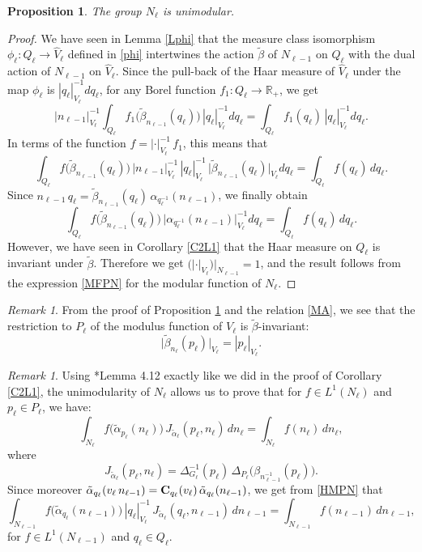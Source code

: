 \documentclass[a4paper,11pt,reqno]{amsart}
\numberwithin{equation}{section}
\newtheorem{proposition}[theorem]{Proposition}
\theoremstyle{remark}
\newtheorem{remark}[theorem]{Remark}
\theoremstyle{definition}
\newcommand{\R}{{\mathbb R}}
\begin{document}
 \begin{proposition}
\label{NUM}
The group $N_\ell$ is unimodular.
\end{proposition}
\begin{proof}
We have seen in Lemma \ref{Lphi} that the  measure class  isomorphism $\phi_\ell:Q_\ell\to \hat V_\ell$ defined in \eqref{phi}
intertwines the action $\tilde\beta$ of $N_{\ell-1}$ on $Q_\ell$ with
the dual action of $N_{\ell-1}$ on $\hat V_\ell$.
Since the pull-back of the Haar  measure of $\hat V_\ell$ under the map $\phi_\ell$ is $|q_\ell|_{V_\ell}^{-1}dq_\ell$,
for any Borel function $f_1:Q_\ell\to\R_+$, we get
$$
|n_{\ell-1}|_{V_\ell}^{-1}\int_{Q_\ell}f_1\big(\tilde\beta_{n_{\ell-1}}(q_\ell)\big)\,|q_\ell|_{V_\ell}^{-1}dq_\ell=\int_{Q_\ell} f_1(q_\ell)\,|q_\ell|_{V_\ell}^{-1}dq_\ell.
$$
In terms of the function $f=|\cdot|_{V_\ell}^{-1}\,f_1$, this means that
$$
\int_{Q_\ell}f\big(\tilde\beta_{n_{\ell-1}}(q_\ell)\big)\,|n_{\ell-1}|_{V_\ell}^{-1}\,|q_\ell|_{V_\ell}^{-1}\,\big|\tilde\beta_{n_{\ell-1}}(q_\ell)\big|_{V_\ell}dq_\ell=\int_{Q_\ell} f(q_\ell)\,dq_\ell.
$$
Since $n_{\ell-1}\, q_\ell=\tilde\beta_{n_{\ell-1}}(q_\ell)\,\alpha_{q_\ell^{-1}}(n_{\ell-1})$,
we finally obtain
$$
\int_{Q_\ell}f\big(\tilde\beta_{n_{\ell-1}}(q_\ell)\big)\,\big|\alpha_{q_\ell^{-1}}(n_{\ell-1})\big|_{V_\ell}^{-1}dq_\ell=\int_{Q_\ell} f(q_\ell)\,dq_\ell.
$$
However, we have seen in Corollary \ref{C2L1} that  the Haar measure on  $Q_\ell$ is invariant under  $\tilde\beta$.
Therefore we get $(|\cdot|_{V_\ell}\big)|_{N_{\ell-1}}=1$, and the result follows from the expression \eqref{MFPN} for the modular function of $N_\ell$.
\end{proof}

\begin{remark}
\label{InvM}
From the proof of Proposition \ref{NUM} and the relation \eqref{MA}, we see that the restriction  to $P_\ell$ of the modulus function of $V_\ell$ is $\tilde\beta$-invariant:
$$
\big|\tilde\beta_{n_\ell}(p_\ell)\big|_{V_\ell}=|p_\ell|_{V_\ell}.
$$
\end{remark}

 \begin{remark}
 \label{IF1}
Using \cite{VV}*{Lemma 4.12} exactly like we did in the proof of Corollary \ref{C2L1}, the unimodularity of $N_\ell$  allows us to prove that
  for   $f\in L^1(N_\ell)$ and $p_\ell\in P_\ell$, we have:
$$
\int_{N_\ell}f\big(\tilde\alpha_{p_\ell}(n_\ell)\big)\, J_{\tilde\alpha_\ell}(p_\ell,n_\ell)\,dn_\ell
=\int_{N_\ell} f(n_\ell)\,dn_\ell,
$$
where
$$
J_{\tilde\alpha_\ell}(p_\ell,n_\ell)=\Delta_{G_\ell}^{-1}(p_\ell) \,\Delta_{P_\ell}\big(\beta_{n_{\ell-1}^{-1}}(p_\ell)\big) .
$$
Since moreover $\tilde\alpha_{q_\ell}(v_\ell \,n_{\ell-1})={\bf C}_{q_\ell}(v_\ell) \,\tilde\alpha_{q_\ell}(n_{\ell-1})$, we get from
\eqref{HMPN} that
$$
\int_{N_{\ell-1}}f\big(\tilde\alpha_{q_\ell}(n_{\ell-1})\big)\, |q_\ell|_{V_\ell}^{-1}\,J_{\tilde\alpha_\ell}(q_\ell,n_{\ell-1})\,dn_{\ell-1}
=\int_{N_{\ell-1}} f(n_{\ell-1})\,dn_{\ell-1},
$$
for   $f\in L^1(N_{\ell-1})$ and $q_\ell\in Q_\ell$.
 \end{remark}
\end{document}
